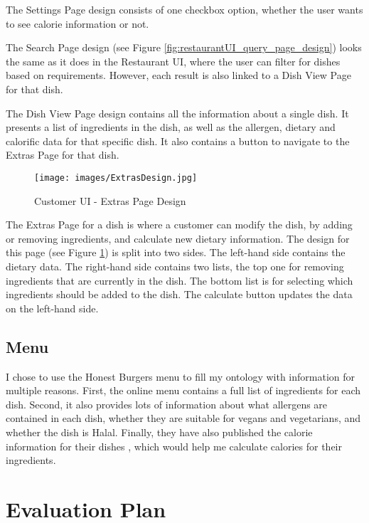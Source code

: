 The Settings Page design consists of one checkbox option, whether the user wants to see calorie information or not.

The Search Page design (see Figure \ref{fig:restaurantUI_query_page_design}) looks the same as it does in the Restaurant UI, where the user can filter for dishes based on requirements. However, each result is also linked to a Dish View Page for that dish.

The Dish View Page design contains all the information about a single dish. It presents a list of ingredients in the dish, as well as the allergen, dietary and calorific data for that specific dish. It also contains a button to navigate to the Extras Page for that dish.

\begin{figure}[h]
    \centering
    \captionsetup{justification=centering}
    \texttt{[image: images/ExtrasDesign.jpg]}
    \caption{Customer UI - Extras Page Design}
    \label{fig:customerUI_extras_design}
\end{figure}

The Extras Page for a dish is where a customer can modify the dish, by adding or removing ingredients, and calculate new dietary information. The design for this page (see Figure \ref{fig:customerUI_extras_design}) is split into two sides. The left-hand side contains the dietary data. The right-hand side contains two lists, the top one for removing ingredients that are currently in the dish. The bottom list is for selecting which ingredients should be added to the dish. The calculate button updates the data on the left-hand side.

\subsection{Menu}

I chose to use the Honest Burgers \cite{honest_burgers_2023} menu to fill my ontology with information for multiple reasons. First, the online menu contains a full list of ingredients for each dish. Second, it also provides lots of information about what allergens are contained in each dish, whether they are suitable for vegans and vegetarians, and whether the dish is Halal. Finally, they have also published the calorie information for their dishes \cite{honest_burgers_nutritional_2022}, which would help me calculate calories for their ingredients.

\section{Evaluation Plan}

